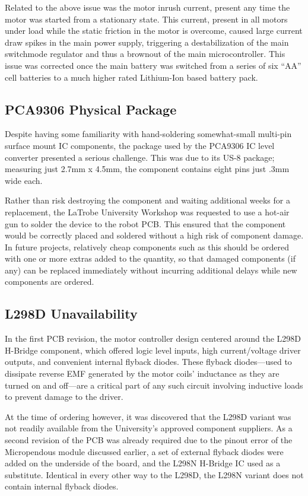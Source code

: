 Related to the above issue was the motor inrush current, present any time the motor was started from a stationary state. This current, present in all motors under load while the static friction in the motor is overcome, caused large current draw spikes in the main power supply, triggering a destabilization of the main switchmode regulator and thus a brownout of the main microcontroller. This issue was corrected once the main battery was switched from a series of six ``AA'' cell batteries to a much higher rated Lithium-Ion based battery pack.

\subsection{PCA9306 Physical Package}

Despite having some familiarity with hand-soldering somewhat-small multi-pin surface mount IC components, the package used by the PCA9306 IC level converter presented a serious challenge. This was due to its US-8 package; measuring just 2.7mm x 4.5mm, the component contains eight pins just .3mm wide each.

Rather than risk destroying the component and waiting additional weeks for a replacement, the LaTrobe University Workshop was requested to use a hot-air gun to solder the device to the robot PCB. This ensured that the component would be correctly placed and soldered without a high risk of component damage. In future projects, relatively cheap components such as this should be ordered with one or more extras added to the quantity, so that damaged components (if any) can be replaced immediately without incurring additional delays while new components are ordered. 

\subsection{L298D Unavailability}

In the first PCB revision, the motor controller design centered around the L298D H-Bridge component, which offered logic level inputs, high current/voltage driver outputs, and convenient internal flyback diodes. These flyback diodes---used to dissipate reverse EMF generated by the motor coils' inductance as they are turned on and off---are a critical part of any such circuit involving inductive loads to prevent damage to the driver.

At the time of ordering however, it was discovered that the L298D variant was not readily available from the University's approved component suppliers. As a second revision of the PCB was already required due to the pinout error of the Micropendous module discussed earlier, a set of external flyback diodes were added on the underside of the board, and the L298N H-Bridge IC used as a substitute. Identical in every other way to the L298D, the L298N variant does not contain internal flyback diodes.

